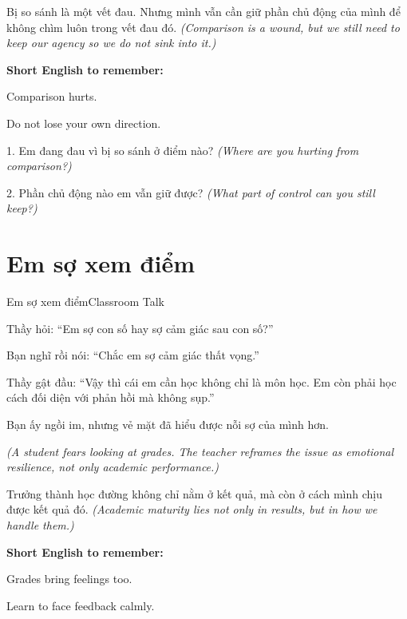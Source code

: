\begin{baihoc}
Bị so sánh là một vết đau. Nhưng mình vẫn cần giữ phần chủ động của mình để không chìm luôn trong vết đau đó.
\textit{(Comparison is a wound, but we still need to keep our agency so we do not sink into it.)}
\end{baihoc}

\begin{ghinhoanh}
\textbf{Short English to remember:}

Comparison hurts.

Do not lose your own direction.
\end{ghinhoanh}

\begin{tuhocnhanh}
1. Em đang đau vì bị so sánh ở điểm nào? \textit{(Where are you hurting from comparison?)}

2. Phần chủ động nào em vẫn giữ được? \textit{(What part of control can you still keep?)}
\end{tuhocnhanh}
\ngancach

\section{Em sợ xem điểm}
\begin{truyen}{Em sợ xem điểm}{Classroom Talk}

Thầy hỏi: ``Em sợ con số hay sợ cảm giác sau con số?''

Bạn nghĩ rồi nói: ``Chắc em sợ cảm giác thất vọng.''

Thầy gật đầu: ``Vậy thì cái em cần học không chỉ là môn học. Em còn phải học cách đối diện với phản hồi mà không sụp.''

Bạn ấy ngồi im, nhưng vẻ mặt đã hiểu được nỗi sợ của mình hơn.

\textit{(A student fears looking at grades. The teacher reframes the issue as emotional resilience, not only academic performance.)}
\end{truyen}

\begin{baihoc}
Trưởng thành học đường không chỉ nằm ở kết quả, mà còn ở cách mình chịu được kết quả đó.
\textit{(Academic maturity lies not only in results, but in how we handle them.)}
\end{baihoc}

\begin{ghinhoanh}
\textbf{Short English to remember:}

Grades bring feelings too.

Learn to face feedback calmly.
\end{ghinhoanh}

